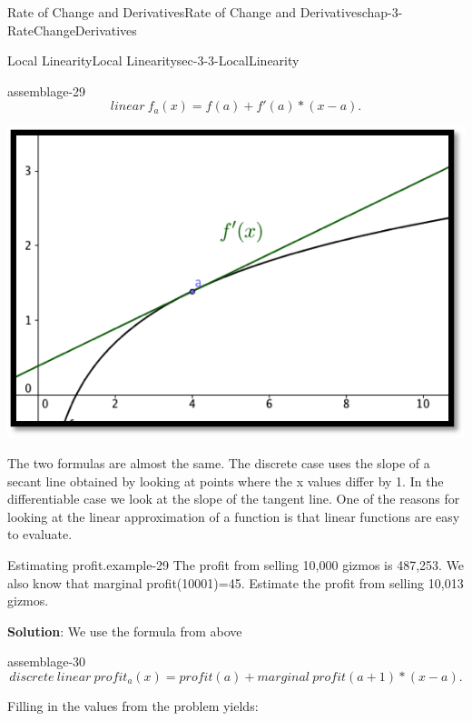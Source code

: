 \documentclass[oneside,10pt,]{book}
\newcommand{\terminology}[1]{\textbf{#1}}
\numberwithin{equation}{section}
\begin{document}
\begin{chapterptx}{Rate of Change and Derivatives}{}{Rate of Change and Derivatives}{}{}{chap-3-RateChangeDerivatives}
\begin{sectionptx}{Local Linearity}{}{Local Linearity}{}{}{sec-3-3-LocalLinearity}
\begin{assemblage}{}{assemblage-29}
\begin{equation*}
linear\ f_a (x)=f(a)+f'(a)*(x-a).
\end{equation*}
%
\end{assemblage}
\begin{sidebyside}{1}{0.2}{0.2}{0}%
\begin{sbspanel}{0.6}%
\includegraphics[width=1\linewidth]{images/sec3-3-2.png}
\end{sbspanel}%
\end{sidebyside}%
\par
\hypertarget{p-1137}{}%
The two formulas are almost the same.  The discrete case uses the slope of a secant line obtained by looking at points where the x values differ by 1.  In the differentiable case we look at the slope of the tangent line.  One of the reasons for looking at the linear approximation of a function is that linear functions are easy to evaluate.%
\begin{example}{Estimating profit.}{example-29}%
\hypertarget{p-1138}{}%
The profit from selling 10,000 gizmos is \textdollar{}487,253.  We also know that marginal profit(10001)=\textdollar{}45.  Estimate the profit from selling 10,013 gizmos.%
\par
\hypertarget{p-1139}{}%
\terminology{Solution}: We use the formula from above%
\begin{assemblage}{}{assemblage-30}%
\hypertarget{p-1140}{}%
%
\begin{equation*}
discrete\ linear\ profit_a (x)=profit(a)+marginal\ profit(a+1)*(x-a).
\end{equation*}
%
\end{assemblage}
\hypertarget{p-1141}{}%
Filling in the values from the problem yields:%
%
\begin{equation*}

\end{equation*}
\end{example}
\end{sectionptx}
\end{chapterptx}
\end{document}
